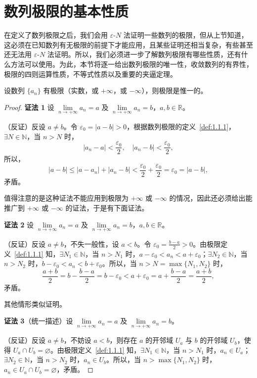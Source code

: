 \section{数列极限的基本性质}\label{sec:1.2}

在定义了数列极限之后，我们会用 $\varepsilon\text{-}N$ 法证明一些数列的极限，但从上节知道，这必须在已知数列有无极限的前提下才能应用，且某些证明还相当复杂，有些甚至还无法用 $\varepsilon\text{-}N$ 法证明。所以，我们必须进一步了解数列极限有哪些性质，还有什么方法可以使用。为此，本节将逐一给出数列极限的唯一性，收敛数列的有界性，极限的四则运算性质，不等式性质以及重要的夹逼定理。

\begin{theorem}[极限的惟一性]\label{thm:1.2.1}
设数列 $\{a_{n}\}$ 有极限（实数，或 $+\infty$，或 $-\infty$），则极限是惟一的。
\end{theorem}

\begin{proof}
\textbf{证法 1} 设 $\lim\limits_{n\to+\infty}a_n=a$ 及 $\lim\limits_{n\to+\infty}a_n=b$，$a,b\in\mathbb{R}$。

（反证）反设 $a \neq b$。令 $\varepsilon_{0} = |a - b| > 0$，根据数列极限的定义~\ref{def:1.1.1}，$\exists N \in \mathbb{N}$，当 $n > N$ 时，
\[
|a_{n}-a|<\frac{\varepsilon_{0}}{2},\quad |a_{n}-b|<\frac{\varepsilon_{0}}{2},
\]
所以，
\[
|a-b| \leqslant |a-a_{n}| + |a_{n}-b| < \frac{\varepsilon_{0}}{2} + \frac{\varepsilon_{0}}{2} = \varepsilon_{0} = |a-b|,
\]
矛盾。

值得注意的是这种证法不能应用到极限为 $+\infty$ 或 $-\infty$ 的情况，因此还必须给出能推广到 $+\infty$ 或 $-\infty$ 的证法，于是有下面证法。

\textbf{证法 2} 设 $\lim\limits_{n\to+\infty}a_n=a$ 及 $\lim\limits_{n\to+\infty}a_n=b$，$a,b\in\mathbb{R}$。

（反证）反设 $a \neq b$，不失一般性，设 $a < b$。令 $\varepsilon_{0} = \frac{b - a}{2} > 0$。由极限定义~\ref{def:1.1.1} 知，$\exists N_{1} \in \mathbb{N}$，当 $n > N_{1}$ 时，$a - \varepsilon_{0} < a_{n} < a + \varepsilon_{0}$；$\exists N_{2} \in \mathbb{N}$，当 $n > N_{2}$ 时，$b - \varepsilon_{0} < a_{n} < b + \varepsilon_{0}$。所以，当 $n > N = \max\{N_{1}, N_{2}\}$ 时，
\[
\frac{a+b}{2} = b - \frac{b-a}{2} = b - \varepsilon_{0} < a + \varepsilon_{0} = a + \frac{b-a}{2} = \frac{a+b}{2},
\]
矛盾。

其他情形类似证明。

\textbf{证法 3}（统一描述）设 $\lim\limits_{n\to+\infty}a_n=a$ 及 $\lim\limits_{n\to+\infty}a_n=b$。

（反证）反设 $a \neq b$，不妨设 $a < b$，则存在 $a$ 的开邻域 $U_a$ 与 $b$ 的开邻域 $U_b$，使得 $U_a \cap U_b = \varnothing$。由极限定义~\ref{def:1.1.1} 知，$\exists N_1 \in \mathbb{N}$，当 $n > N_1$ 时，$a_n \in U_a$；$\exists N_2 \in \mathbb{N}$，当 $n > N_2$ 时，$a_n \in U_b$。所以，当 $n > \max\{N_1, N_2\}$ 时，$a_n \in U_a \cap U_b = \varnothing$，矛盾。
\end{proof}

